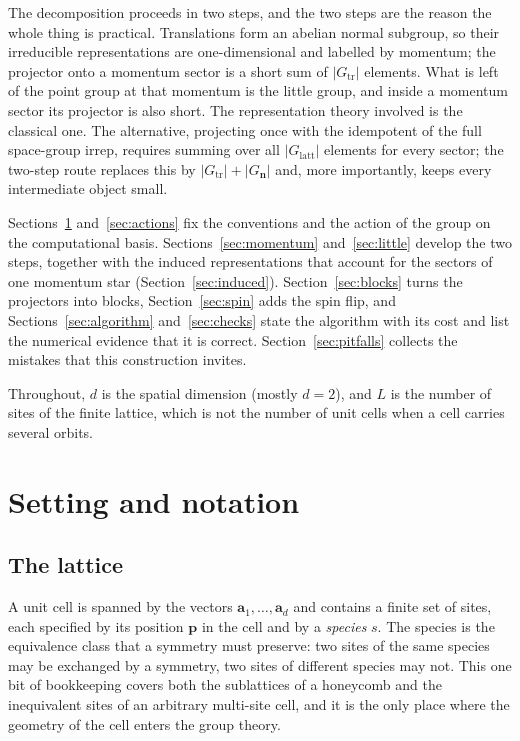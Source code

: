 \documentclass[12pt]{article}
\begin{document}
The decomposition proceeds in two steps, and the two steps are the reason the
whole thing is practical. Translations form an abelian normal subgroup, so their
irreducible representations are one-dimensional and labelled by momentum; the
projector onto a momentum sector is a short sum of $|G_{\mathrm{tr}}|$ elements.
What is left of the point group at that momentum is the little group, and inside
a momentum sector its projector is also short. The representation theory involved
is the classical one\cite{fulton1991representation,serre1977}. The alternative, projecting once
with the idempotent of the full space-group irrep, requires summing over all
$|G_{\mathrm{latt}}|$ elements for every sector; the two-step route replaces this by
$|G_{\mathrm{tr}}| + |G_{\mathbf{n}}|$ and, more importantly, keeps every
intermediate object small.

Sections~\ref{sec:setting} and~\ref{sec:actions} fix the conventions and the
action of the group on the computational basis. Sections~\ref{sec:momentum}
and~\ref{sec:little} develop the two steps, together with the induced
representations that account for the sectors of one momentum star
(Section~\ref{sec:induced}). Section~\ref{sec:blocks} turns the projectors into
blocks, Section~\ref{sec:spin} adds the spin flip, and
Sections~\ref{sec:algorithm} and~\ref{sec:checks} state the algorithm with its
cost and list the numerical evidence that it is correct.
Section~\ref{sec:pitfalls} collects the mistakes that this construction invites.

Throughout, $d$ is the spatial dimension (mostly $d=2$), and $L$ is the number of
sites of the finite lattice, which is not the number of unit cells when a cell
carries several orbits.

\section{Setting and notation}\label{sec:setting}

\subsection{The lattice}

A unit cell is spanned by the vectors $\mathbf{a}_1,\dots,\mathbf{a}_d$ and
contains a finite set of sites, each specified by its position $\mathbf{p}$ in the
cell and by a \emph{species} $s$. The species is the equivalence class that a
symmetry must preserve: two sites of the same species may be exchanged by a
symmetry, two sites of different species may not. This one bit of bookkeeping
covers both the sublattices of a honeycomb and the inequivalent sites of an
arbitrary multi-site cell, and it is the only place where the geometry of the
cell enters the group theory.
\end{document}
